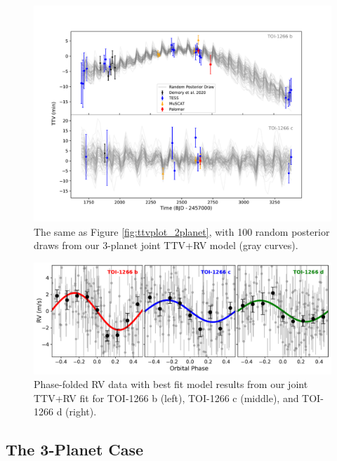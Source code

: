 \documentclass[twocolumn]{aastex631}
\begin{document}
\begin{figure}
\begin{center}
  \includegraphics[width=17.5cm]{1266_TTVs_JointFit.pdf}
  \caption{The same as Figure \ref{fig:ttvplot_2planet}, with 100 random posterior draws from our 3-planet joint TTV+RV model (gray curves).}
  \label{fig:ttvplot_joint}
\end{center}
\end{figure}

\begin{figure}
\begin{center}
  \includegraphics[width=17.5cm]{1266_RVs_Joint.pdf}
  \caption{Phase-folded RV data with best fit model results from our joint TTV+RV fit for TOI-1266 b (left), TOI-1266 c (middle), and TOI-1266 d (right).}
  \label{fig:RVplot_joint}
\end{center}
\end{figure}

\subsection{The 3-Planet Case} \label{sec:3-planet TTVs}
\end{document}
